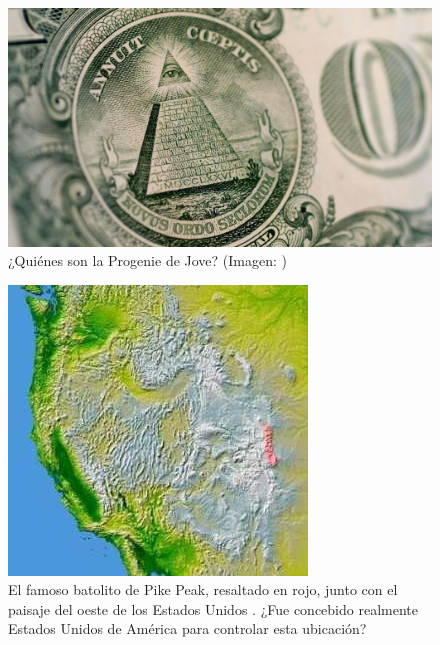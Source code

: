 \documentclass[10pt,twocolumn,letterpaper]{article}
\begin{document}
\begin{figure}[h]
\begin{center}
   \includegraphics[width=1\linewidth]{illuminati.jpg}
\end{center}
   \caption{¿Quiénes son la Progenie de Jove? (Imagen: \cite{35})}
\label{fig:10}
\label{fig:onecol}
\end{figure}

\begin{figure}[t]
\begin{center}
   \includegraphics[width=1\linewidth]{pike.jpg}
\end{center}
   \caption{El famoso batolito de Pike Peak, resaltado en rojo, junto con el paisaje del oeste de los Estados Unidos \cite{36}. ¿Fue concebido realmente Estados Unidos de América para controlar esta ubicación?}
\label{fig:11}
\label{fig:onecol}
\end{figure}
\end{document}
